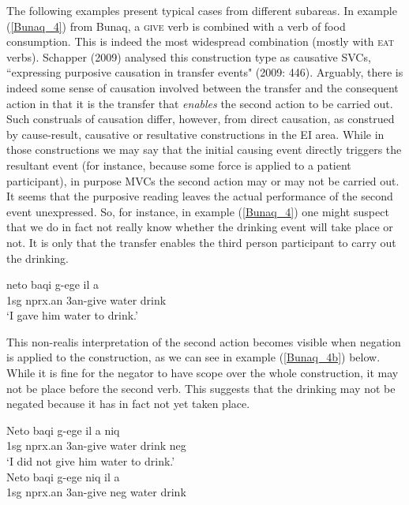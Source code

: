 The following examples present typical cases from different subareas. In example (\ref{Bunaq_4}) from Bunaq, a \textsc{give} verb is combined with a verb of food consumption. This is indeed the most widespread combination (mostly with \textsc{eat} verbs). Schapper (2009) analysed this construction type as causative SVCs, ``expressing purposive causation in transfer events" (2009: 446). Arguably, there is indeed some sense of causation involved between the transfer and the consequent action in that it is the transfer that \emph{enables} the second action to be carried out. Such construals of causation differ, however, from direct causation, as construed by cause-result, causative or resultative constructions in the EI area. While in those constructions we may say that the initial causing event directly triggers the resultant event (for instance, because some force is applied to a patient participant), in purpose MVCs the second action may or may not be carried out. It seems that the purposive reading leaves the actual performance of the second event unexpressed. So, for instance, in example (\ref{Bunaq_4}) one might suspect that we do in fact not really know whether the drinking event will take place or not. It is only that the transfer enables the third person participant to carry out the drinking. 

\ea \label{Bunaq_4}
\gll neto baqi g-ege il a \\
1\acs{sg} \acs{nprx}.\acs{an} 3\acs{an}-give water drink \\
\glft ‘I gave him water to drink.’ \\ 
\z
\xe

This non-realis interpretation of the second action becomes visible when negation is applied to the construction, as we can see in example (\ref{Bunaq_4b}) below. While it is fine for the negator to have scope over the whole construction, it may not be place before the second verb. This suggests that the drinking may not be negated because it has in fact not yet taken place. 

\pex \label{Bunaq_4b}
\a
\gll Neto baqi g-ege il a niq \\
1\acs{sg} \acs{nprx}.\acs{an} 3\acs{an}-give water drink \acs{neg} \\
\glft ‘I did not give him water to drink.’ \\ 
\z
\a
\gll *Neto baqi g-ege niq il a \\ 
1\acs{sg} \acs{nprx}.\acs{an} 3\acs{an}-give \acs{neg} water drink \\
\glft  {}\\ 
\z
\xe

